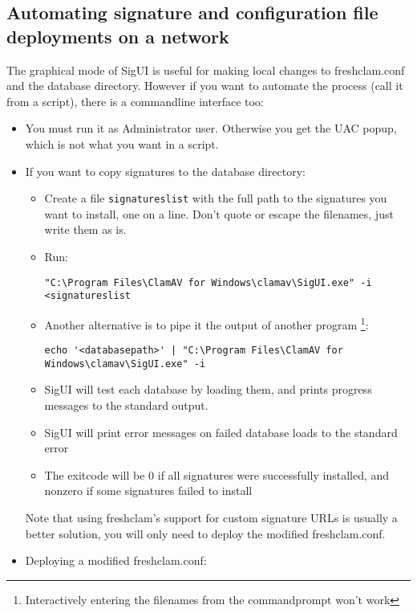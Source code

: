 \subsection{Automating signature and configuration file deployments on a network}
\label{sec:customautomatedcopy}
\label{sec:deploy_conf}

The graphical mode of SigUI is useful for making local changes to \gls{freshclam.conf} and the database directory. However if you want to automate the process (call it from a script), there is a commandline interface too:
\begin{itemize}
	\item You must run it as Administrator user. Otherwise you get the \gls{UAC} popup, which is not what you want in a script.
	\item If you want to copy signatures to the database directory:
		\begin{itemize}
			\item Create a file \verb+signatureslist+ with the full path to the signatures you want to install, one on a line. Don't quote or escape the filenames, just write them as is.
			\item Run:
\begin{verbatim}
"C:\Program Files\ClamAV for Windows\clamav\SigUI.exe" -i <signatureslist
\end{verbatim}
			\item Another alternative is to pipe it the output of another program \footnote{Interactively entering the filenames from the commandprompt won't work}:
\begin{verbatim}
echo '<databasepath>' | "C:\Program Files\ClamAV for Windows\clamav\SigUI.exe" -i
\end{verbatim}
			\item SigUI will test each database by loading them, and prints progress messages to the standard output.
			\item SigUI will print error messages on failed database loads to the standard error
			\item The exitcode will be 0 if all signatures were successfully installed, and nonzero if some signatures failed to install
		\end{itemize}
Note that using \gls{freshclam}'s support for custom signature URLs is usually a better solution, you will only need to deploy the modified \gls{freshclam.conf}.
\item Deploying a modified \gls{freshclam.conf}:


\end{itemize}
